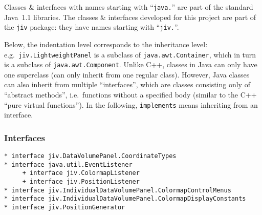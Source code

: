 
Classes \& interfaces with names starting with ``\verb+java.+'' are part
of the standard Java~1.1 libraries.  The classes \& interfaces
developed for this project are part of the \verb+jiv+ package: they
have names starting with ``\verb+jiv.+''.

Below, the indentation level corresponds to the inheritance level:
e.g.\ \verb+jiv.LightweightPanel+ is a subclass of
\verb+java.awt.Container+, which in turn is a subclass of
\verb+java.awt.Component+.  Unlike C++, classes in Java can only have
one superclass (can only inherit from one regular class).  However,
Java classes can also inherit from multiple ``interfaces'', which are
classes consisting only of ``abstract methods'', i.e.\ functions
without a specified body (similar to the C++ ``pure virtual
functions'').  In the following, \texttt{implements} means inheriting
from an interface.




\subsubsection{Interfaces}
\small
\begin{verbatim}
* interface jiv.DataVolumePanel.CoordinateTypes
* interface java.util.EventListener
     + interface jiv.ColormapListener
     + interface jiv.PositionListener
* interface jiv.IndividualDataVolumePanel.ColormapControlMenus
* interface jiv.IndividualDataVolumePanel.ColormapDisplayConstants
* interface jiv.PositionGenerator
\end{verbatim}
\normalsize
   
